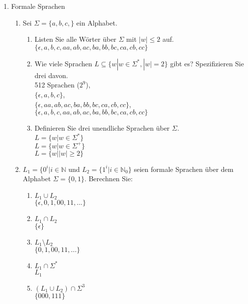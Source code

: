 \documentclass{scrartcl}
\begin{document}
\begin{enumerate}
\item Formale Sprachen

\begin{enumerate}[label*=\arabic*.]
\item Sei $\Sigma = \{a, b, c,\}$ ein Alphabet.
\begin{enumerate}[label=(\alph*)]
\item Listen Sie alle Wörter über $\Sigma$ mit $|w| \leq 2$ auf.
\\ $\{\epsilon,a,b,c,aa,ab,ac,ba,bb,bc,ca,cb,cc\}$
\item Wie viele Sprachen $L \subseteq \{w | w \in \Sigma^*, |w| = 2 \}$ gibt es? Spezifizieren Sie drei davon.
\\ 512 Sprachen ($2^9$), 
\\ $\{\epsilon,a,b,c\}$, 
\\ $\{\epsilon,aa,ab,ac,ba,bb,bc,ca,cb,cc\}$, 
\\ $\{\epsilon,a,b,c,aa,ab,ac,ba,bb,bc,ca,cb,cc\}$
\item Definieren Sie drei unendliche Sprachen über $\Sigma$.
\\ $ L=\{w|w \in \Sigma^*\}$
\\ $L=\{w|w \in \Sigma^+\}$
\\ $L=\{w| |w| \geq 2\}$
\end{enumerate}

\item $L_1 = \{0^i | i \in \mathbb{N}$ und $L_2 = \{1^i | i \in \mathbb{N}_0\}$ seien formale Sprachen über dem Alphabet $\Sigma = \{0, 1\}$. Berechnen Sie:

\begin{enumerate}[label=(\alph*)]
\item $L_1 \cup L_2$
\\ $\{\epsilon, 0,1,00,11,...\}$
\item $L_1 \cap L_2$
\\ $\{\epsilon\}$
\item $L_1 \setminus L_2$
\\ $\{0,1,00,11,...\}$
\item $L_1 \cap \Sigma^*$
\\ $L_1$
\item $(L_1 \cup L_2) \cap \Sigma^3$
\\ $\{000,111\}$
\end{enumerate}


\end{enumerate}
\end{enumerate}
\end{document}
